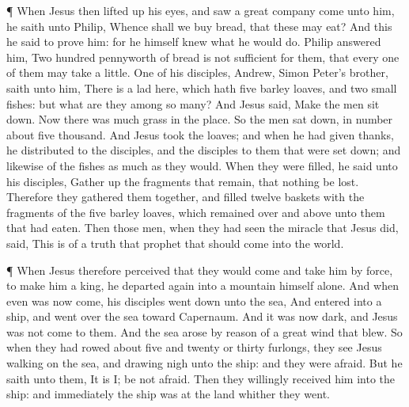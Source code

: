  ¶ When Jesus then lifted up his eyes, and saw a great
company come unto him, he saith unto Philip, Whence shall we buy bread,
that these may eat?  And this he said to prove him: for he
himself knew what he would do.  Philip answered him, Two
hundred pennyworth of bread is not sufficient for them, that every one
of them may take a little.  One of his disciples, Andrew,
Simon Peter's brother, saith unto him,  There is a lad here,
which hath five barley loaves, and two small fishes: but what are they
among so many?  And Jesus said, Make the men sit down. Now
there was much grass in the place. So the men sat down, in number about
five thousand.  And Jesus took the loaves; and when he had
given thanks, he distributed to the disciples, and the disciples to them
that were set down; and likewise of the fishes as much as they would.
 When they were filled, he said unto his disciples, Gather
up the fragments that remain, that nothing be lost. 
Therefore they gathered them together, and filled twelve baskets with
the fragments of the five barley loaves, which remained over and above
unto them that had eaten.  Then those men, when they had
seen the miracle that Jesus did, said, This is of a truth that prophet
that should come into the world.

 ¶ When Jesus therefore perceived that they would come and
take him by force, to make him a king, he departed again into a mountain
himself alone.  And when even was now come, his disciples
went down unto the sea,  And entered into a ship, and went
over the sea toward Capernaum. And it was now dark, and Jesus was not
come to them.  And the sea arose by reason of a great wind
that blew.  So when they had rowed about five and twenty or
thirty furlongs, they see Jesus walking on the sea, and drawing nigh
unto the ship: and they were afraid.  But he saith unto
them, It is I; be not afraid.  Then they willingly received
him into the ship: and immediately the ship was at the land whither they
went.

